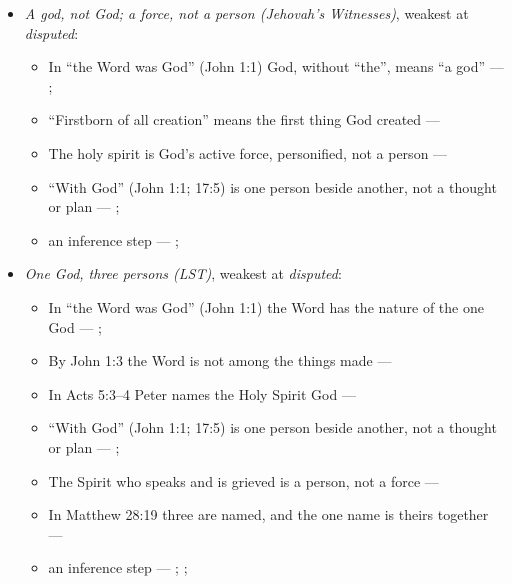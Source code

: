 \documentclass[11pt,paper=\testimonypaper,DIV=13,parskip=false]{scrartcl}
\begin{document}
\begin{itemize}
\item \emph{A god, not God; a force, not a person (Jehovah’s Witnesses)}, weakest at \emph{disputed}:
\begin{itemize}
\item In “the Word was God” (John 1:1) God, without “the”, means “a god” --- \cite[27]{watchtower-should-you-believe-trinity-1989}; \cite{new-world-translation-2013}
\item “Firstborn of all creation” means the first thing God created --- \cite[14]{watchtower-should-you-believe-trinity-1989}
\item The holy spirit is God’s active force, personified, not a person --- \cite[20--23]{watchtower-should-you-believe-trinity-1989}
\item “With God” (John 1:1; 17:5) is one person beside another, not a thought or plan --- \cite[3, The Triune God]{kibbey-living-systematic-theology-2026}; \cite[27]{watchtower-should-you-believe-trinity-1989}
\item an inference step --- \cite[23]{watchtower-should-you-believe-trinity-1989}; \cite[122--123]{roberts-christendom-astray}
\end{itemize}
\item \emph{One God, three persons (LST)}, weakest at \emph{disputed}:
\begin{itemize}
\item In “the Word was God” (John 1:1) the Word has the nature of the one God --- \cite{harner-qualitative-anarthrous-1973}; \cite[3, The Triune God]{kibbey-living-systematic-theology-2026}
\item By John 1:3 the Word is not among the things made --- \cite[Tractates on John I.11]{schaff-nicene-post-nicene-fathers-1-7}
\item In Acts 5:3–4 Peter names the Holy Spirit God --- \cite[198]{calvin-commentary-acts-1844}
\item “With God” (John 1:1; 17:5) is one person beside another, not a thought or plan --- \cite[3, The Triune God]{kibbey-living-systematic-theology-2026}; \cite[27]{watchtower-should-you-believe-trinity-1989}
\item The Spirit who speaks and is grieved is a person, not a force --- \cite[3, The Triune God]{kibbey-living-systematic-theology-2026}
\item In Matthew 28:19 three are named, and the one name is theirs together --- \cite[3, The Triune God]{kibbey-living-systematic-theology-2026}
\item an inference step --- \cite[3, The Triune God]{kibbey-living-systematic-theology-2026}; \cite[ch. 4, Conclusion]{bernard-oneness-of-god-1983}; \cite[17--19]{buzzard-caveat-lector-2001}

\end{itemize}
\end{itemize}
\end{document}
